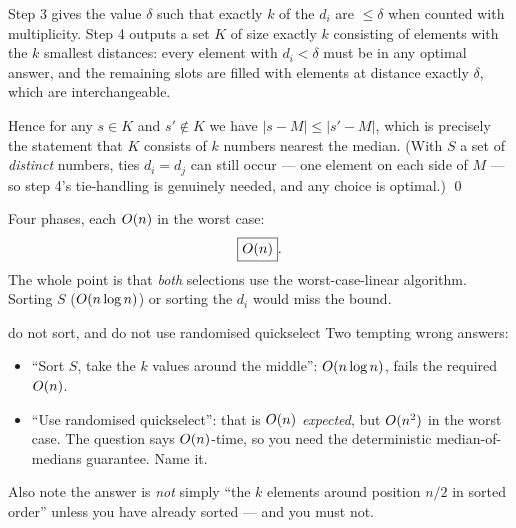 \begin{correct}
Step 3 gives the value $\delta$ such that exactly $k$ of the $d_i$ are $\le\delta$ when counted
with multiplicity. Step 4 outputs a set $K$ of size exactly $k$ consisting of elements with the
$k$ smallest distances: every element with $d_i<\delta$ must be in any optimal answer, and the
remaining slots are filled with elements at distance exactly $\delta$, which are interchangeable.

Hence for any $s\in K$ and $s'\notin K$ we have $|s-M|\le|s'-M|$, which is precisely the
statement that $K$ consists of $k$ numbers nearest the median. (With $S$ a set of \emph{distinct}
numbers, ties $d_i=d_j$ can still occur --- one element on each side of $M$ --- so step 4's
tie-handling is genuinely needed, and any choice is optimal.) \qed
\end{correct}

\begin{cplx}
Four phases, each $O(n)$ in the worst case:
\[
  \boxed{O(n)} .
\]
The whole point is that \emph{both} selections use the worst-case-linear algorithm. Sorting $S$
($O(n\log n)$) or sorting the $d_i$ would miss the bound.
\end{cplx}

\begin{trap}{do not sort, and do not use randomised quickselect}
Two tempting wrong answers:
\begin{itemize}
  \item ``Sort $S$, take the $k$ values around the middle'': $O(n\log n)$, fails the required
        $O(n)$.
  \item ``Use randomised quickselect'': that is $O(n)$ \emph{expected}, but $O(n^2)$ in the
        worst case. The question says $O(n)$-time, so you need the deterministic
        median-of-medians guarantee. Name it.
\end{itemize}
Also note the answer is \emph{not} simply ``the $k$ elements around position $n/2$ in sorted
order'' unless you have already sorted --- and you must not.
\end{trap}
